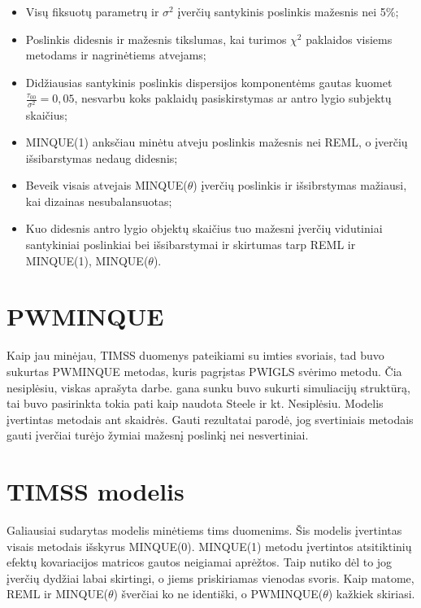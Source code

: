 \documentclass[12pt,a4paper]{article}
\begin{document}
\begin{itemize}
\item Visų fiksuotų parametrų ir $\sigma^2$ įverčių santykinis poslinkis mažesnis nei 5\%;
\item Poslinkis didesnis ir mažesnis tikslumas, kai turimos $\chi^2$ paklaidos visiems metodams ir nagrinėtiems atvejams;
\item Didžiausias santykinis poslinkis dispersijos komponentėms gautas kuomet $\frac{\tau_{00}}{\sigma^2}=0,05$, nesvarbu koks paklaidų pasiskirstymas ar antro lygio subjektų skaičius;
\item MINQUE(1) anksčiau minėtu atveju poslinkis mažesnis nei REML, o įverčių išsibarstymas nedaug didesnis;
\item Beveik visais atvejais MINQUE($\theta$) įverčių poslinkis  ir išsibrstymas mažiausi, kai dizainas nesubalansuotas;
\item Kuo didesnis antro lygio objektų skaičius tuo mažesni įverčių vidutiniai santykiniai poslinkiai bei išsibarstymai ir skirtumas tarp REML ir MINQUE(1), MINQUE($\theta$).
\end{itemize}

\section*{PWMINQUE}
Kaip jau minėjau, TIMSS duomenys pateikiami su imties svoriais, tad buvo sukurtas PWMINQUE metodas, kuris pagrįstas PWIGLS svėrimo metodu. Čia nesiplėsiu, viskas aprašyta darbe. gana sunku buvo sukurti simuliacijų struktūrą, tai buvo pasirinkta tokia pati kaip naudota Steele ir kt. Nesiplėsiu. Modelis įvertintas metodais ant skaidrės. Gauti rezultatai parodė, jog svertiniais metodais gauti įverčiai turėjo žymiai mažesnį poslinkį nei nesvertiniai.

\section*{TIMSS modelis}
Galiausiai sudarytas modelis minėtiems tims duomenims. Šis modelis įvertintas visais metodais išskyrus MINQUE(0). MINQUE(1) metodu įvertintos atsitiktinių efektų kovariacijos matricos gautos neigiamai aprėžtos. Taip nutiko dėl to jog įverčių dydžiai labai skirtingi, o jiems priskiriamas vienodas svoris. Kaip matome, REML ir MINQUE($\theta$) šverčiai ko ne identiški, o PWMINQUE($\theta$) kažkiek skiriasi.
\end{document}
